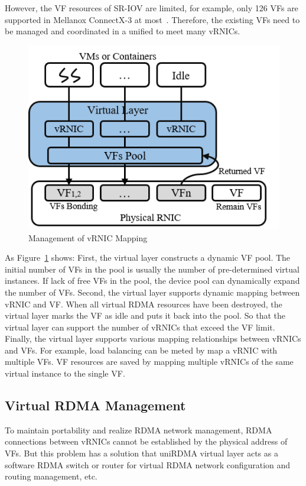 However, the VF resources of SR-IOV are limited, for example, only 126 VFs are supported in Mellanox ConnectX-3 at most~\cite{ofed-manual}. Therefore, the existing VFs need to be managed and coordinated in a unified to meet many vRNICs.

\begin{figure}[!ht]
	\centering
	\includegraphics[width=0.9\linewidth]{images/vf-mapping}
	\caption{Management of vRNIC Mapping}
	\label{fig:vf-mapping}
\end{figure}

As Figure~\ref{fig:vf-mapping} shows: First, the virtual layer constructs a dynamic VF pool. The initial number of VFs in the pool is usually the number of pre-determined virtual instances. If lack of free VFs in the pool, the device pool can dynamically expand the number of VFs. Second, the virtual layer supports dynamic mapping between vRNIC and VF. When all virtual RDMA resources have been destroyed, the virtual layer marks the VF as idle and puts it back into the pool. So that the virtual layer can support the number of vRNICs that exceed the VF limit. Finally, the virtual layer supports various mapping relationships between vRNICs and VFs. For example, load balancing can be meted by map a vRNIC with multiple VFs. VF resources are saved by mapping multiple vRNICs of the same virtual instance to the single VF. 

\subsection{Virtual RDMA Management}
To maintain portability and realize RDMA network management, RDMA connections between vRNICs cannot be established by the physical address of VFs. But this problem has a solution that uniRDMA virtual layer acts as a software RDMA switch or router for virtual RDMA network configuration and routing management, etc.

